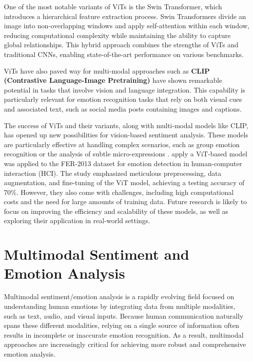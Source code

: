 One of the most notable variants of ViTs is the Swin Transformer, which introduces a hierarchical feature extraction process. Swin Transformers divide an image into non-overlapping windows and apply self-attention within each window, reducing computational complexity while maintaining the ability to capture global relationships. This hybrid approach combines the strengths of ViTs and traditional CNNs, enabling state-of-the-art performance on various benchmarks. 
\newline

ViTs have also paved way for multi-modal approaches such as \textbf{CLIP (Contrastive Language-Image Pretraining)} \cite{radford2021learningtransferablevisualmodels} have shown remarkable potential in tasks that involve vision and language integration. This capability is particularly relevant for emotion recognition tasks that rely on both visual cues and associated text, such as social media posts containing images and captions.
\newline

The success of ViTs and their variants, along with multi-modal models like CLIP, has opened up new possibilities for vision-based sentiment analysis. These models are particularly effective at handling complex scenarios, such as group emotion recognition or the analysis of subtle micro-expressions \cite{liu2021swintransformerhierarchicalvision}. \citet{soni_vision_2024} apply a ViT-based model was applied to the FER-2013 dataset for emotion detection in human-computer interaction (HCI). The study emphasized meticulous preprocessing, data augmentation, and fine-tuning of the ViT model, achieving a testing accuracy of 70\%. However, they also come with challenges, including high computational costs and the need for large amounts of training data. Future research is likely to focus on improving the efficiency and scalability of these models, as well as exploring their application in real-world settings.


\section{Multimodal Sentiment and Emotion Analysis}
\label{sec:multimodal_analysis}

Multimodal sentiment/emotion analysis is a rapidly evolving field focused on understanding human emotions by integrating data from multiple modalities, such as text, audio, and visual inputs. Because human communication naturally spans these different modalities, relying on a single source of information often results in incomplete or inaccurate emotion recognition. As a result, multimodal approaches are increasingly critical for achieving more robust and comprehensive emotion analysis. 

